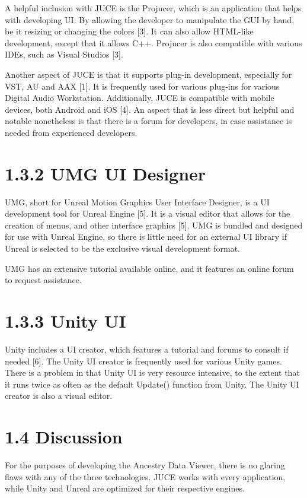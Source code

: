 \documentclass[onecolumn, draftclsnofoot,10pt, compsoc]{IEEEtran}
\begin{document}
A helpful inclusion with JUCE is the Projucer, which is an application that helps with developing UI. By allowing the developer to manipulate the GUI by hand, be it resizing or changing the colors [3]. It can also allow HTML-like development, except that it allows C++. Projucer is also compatible with various IDEs, such as Visual Studios [3].

Another aspect of JUCE is that it supports plug-in development, especially for VST, AU and AAX [1]. It is frequently used for various plug-ins for various Digital Audio Workstation. Additionally, JUCE is compatible with mobile devices, both Android and iOS [4]. An aspect that is less direct but helpful and notable nonetheless is that there is a forum for developers, in case assistance is needed from experienced developers.

\section{1.3.2 UMG UI Designer}
UMG, short for Unreal Motion Graphics User Interface Designer, is a UI development tool for Unreal Engine [5]. It is a visual editor that allows for the creation of menus, and other interface graphics [5]. UMG is bundled and designed for use with Unreal Engine, so there is little need for an external UI library if Unreal is selected to be the exclusive visual development format. 

UMG has an extensive tutorial available online, and it features an online forum to request assistance.

\section{1.3.3 Unity UI}
Unity includes a UI creator, which features a tutorial and forums to consult if needed [6]. The Unity UI creator is frequently used for various Unity games. There is a problem in that Unity UI is very resource intensive, to the extent that it runs twice as often as the default Update() function from Unity. The Unity UI creator is also a visual editor.

\section{1.4 Discussion}
For the purposes of developing the Ancestry Data Viewer, there is no glaring flaws with any of the three technologies. JUCE works with every application, while Unity and Unreal are optimized for their respective engines. 
\end{document}
